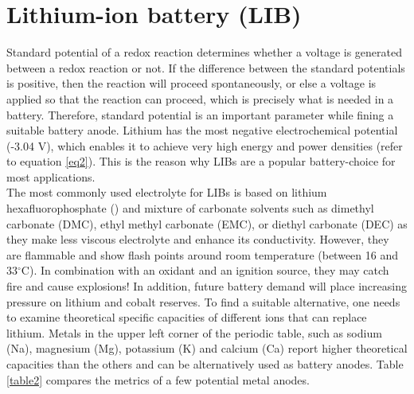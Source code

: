 \section{Lithium-ion battery (LIB)}
Standard potential of a redox reaction determines whether a voltage is generated between a redox reaction or not. If the difference between the standard potentials is positive, then the reaction will proceed spontaneously, or else a voltage is applied so that the reaction can proceed, which is precisely what is needed in a battery. Therefore, standard potential is an important parameter while fining a suitable battery anode\cite{liu_understanding_2016}. Lithium has the most negative electrochemical potential (-3.04 V), which enables it to achieve very high energy and power densities (refer to equation \ref{eq2}). This is the reason why LIBs are a popular battery-choice for most applications.\\
The most commonly used electrolyte for LIBs is based on lithium hexafluorophosphate () and mixture of carbonate solvents such as dimethyl carbonate (DMC), ethyl methyl carbonate (EMC), or diethyl carbonate (DEC) as they make less viscous electrolyte and enhance its conductivity. However, they are flammable and show flash points around room temperature (between 16 and 33$^{\circ}$C). In combination with an oxidant and an ignition source, they may catch fire and cause explosions! In addition, future battery demand will place increasing pressure on lithium and cobalt reserves\cite{turcheniuk_ten_2018}. To find a suitable alternative, one needs to examine theoretical specific capacities of different ions that can replace lithium. Metals in the upper left corner of the periodic table, such as sodium (Na), magnesium (Mg), potassium (K) and calcium (Ca) report higher theoretical capacities than the others and can be alternatively used as battery anodes. Table  \ref{table2} compares the metrics of a few potential metal anodes. 

